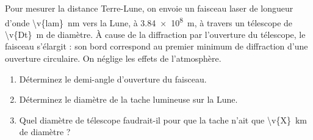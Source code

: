 Pour mesurer la distance Terre-Lune, on envoie un faisceau laser de longueur d'onde \qty{\v{lam}}{nm} vers la Lune, à \qty{3.84e8}{m}, à travers un télescope de \qty{\v{Dt}}{m} de diamètre. À cause de la diffraction par l'ouverture du télescope, le faisceau s'élargit : son bord correspond au premier minimum de diffraction d'une ouverture circulaire. On néglige les effets de l'atmosphère.

\begin{enumerate}[label=\alph*)]
    \item Déterminez le demi-angle d'ouverture du faisceau.
    \item Déterminez le diamètre de la tache lumineuse sur la Lune.
    \item Quel diamètre de télescope faudrait-il pour que la tache n'ait que \qty{\v{X}}{km} de diamètre ?
\end{enumerate}
